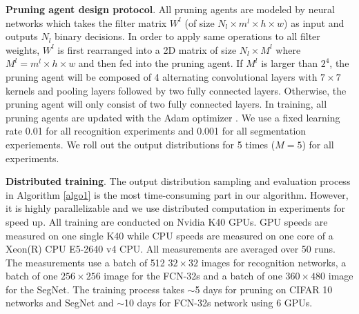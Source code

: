 \documentclass[10pt,twocolumn,letterpaper]{article}
\begin{document}
\textbf{Pruning agent design protocol}. All pruning agents are modeled by neural networks which takes the filter matrix  $W^l$ (of size $N_l \times m^l \times h \times w$) as input and outputs $N_l$ binary decisions. In order to apply same operations to all filter weights, $W^l $ is first rearranged into a 2D matrix of size $N_l \times M^l$ where $M^l=m^l \times h \times w$ and then fed into the pruning agent. If $M^l$ is larger than $2^4$, the pruning agent will be composed of 4 alternating convolutional layers with $7\times7$ kernels and pooling layers followed by two fully connected layers. Otherwise, the pruning agent will only consist of two fully connected layers. In training, all pruning agents are updated with the Adam optimizer \cite{adam}. We use a fixed learning rate 0.01 for all recognition experiments and 0.001 for all segmentation experiements. We roll out the output distributions for 5 times ($M=5$) for all experiments.

\textbf{Distributed training}. The output distribution sampling and evaluation process in Algorithm \ref{algo1} is the most time-consuming part in our algorithm. However, it is highly parallelizable and we use distributed computation in experiments for speed up. All training are conducted on Nvidia K40 GPUs. GPU speeds are measured on one single K40 while CPU speeds are measured on one core of a Xeon(R) CPU E5-2640 v4 CPU. All measurements are averaged over 50 runs. The measurements use a batch of 512 $32\times32$ images for recognition networks, a batch of one $256\times256$ image for the FCN-32s and a batch of one $360\times480$ image for the SegNet. The training process takes $\sim$5 days for pruning on CIFAR 10 networks and SegNet and $\sim$10 days for FCN-32s network using 6 GPUs.
\end{document}
